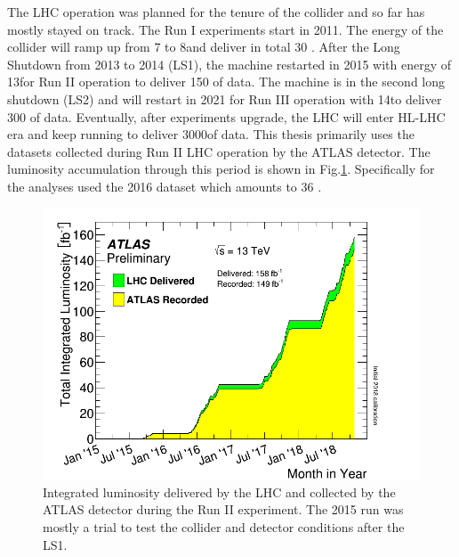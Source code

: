 The LHC operation was planned for the tenure of the collider and so far has mostly stayed on track. The Run I experiments start in 2011. The energy of the collider will ramp up from 7 to 8\tev and deliver in total 30 \ifb. After the Long Shutdown from 2013 to 2014 (LS1), the machine restarted in 2015 with energy of 13\tev for Run II operation to deliver 150 \ifb of data. The machine is in the second long shutdown (LS2) and will restart in 2021 for Run III operation with 14\tev to deliver 300 \ifb of data. Eventually, after experiments upgrade, the LHC will enter HL-LHC era and keep running to deliver 3000\ifb of data. This thesis primarily uses the datasets collected during Run II LHC operation by the ATLAS detector. The luminosity accumulation through this period is shown in Fig.\ref{fig:lhc-lumi}. Specifically for the analyses used the 2016 dataset which amounts to 36 \ifb.


\begin{figure}[htpb!]
\begin{center}
  \includegraphics[width=0.5\linewidth]{figures/LHC/intlumivstimeRun2.png}
\caption{Integrated luminosity delivered by the LHC and collected by the ATLAS detector during the Run II experiment. The 2015 run was mostly a trial to test the collider and detector conditions after the LS1.}
\label{fig:lhc-lumi}
\end{center}
\end{figure}
